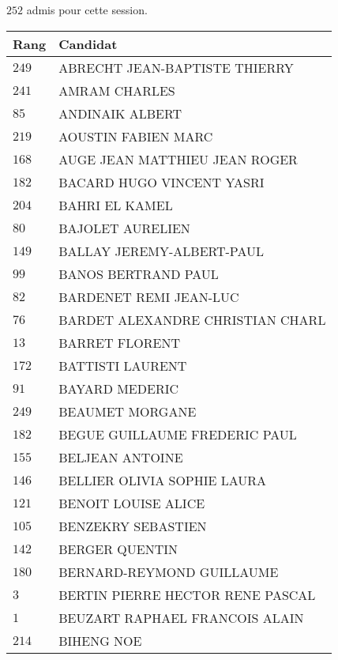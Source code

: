 



  $252$ admis pour cette session.

  \begin{xltabular}{\linewidth}{|l|X|}
    \hline
    \textbf{Rang} & \textbf{Candidat} \\
    \hline
    $249$ & ABRECHT JEAN-BAPTISTE THIERRY \\
    \hline
    $241$ & AMRAM CHARLES \\
    \hline
    $85$ & ANDINAIK ALBERT \\
    \hline
    $219$ & AOUSTIN FABIEN MARC \\
    \hline
    $168$ & AUGE JEAN MATTHIEU JEAN ROGER \\
    \hline
    $182$ & BACARD HUGO VINCENT YASRI \\
    \hline
    $204$ & BAHRI EL KAMEL \\
    \hline
    $80$ & BAJOLET AURELIEN \\
    \hline
    $149$ & BALLAY JEREMY-ALBERT-PAUL \\
    \hline
    $99$ & BANOS BERTRAND PAUL \\
    \hline
    $82$ & BARDENET REMI JEAN-LUC \\
    \hline
    $76$ & BARDET ALEXANDRE CHRISTIAN CHARL \\
    \hline
    $13$ & BARRET FLORENT \\
    \hline
    $172$ & BATTISTI LAURENT \\
    \hline
    $91$ & BAYARD MEDERIC \\
    \hline
    $249$ & BEAUMET MORGANE \\
    \hline
    $182$ & BEGUE GUILLAUME FREDERIC PAUL \\
    \hline
    $155$ & BELJEAN ANTOINE \\
    \hline
    $146$ & BELLIER OLIVIA SOPHIE LAURA \\
    \hline
    $121$ & BENOIT LOUISE ALICE \\
    \hline
    $105$ & BENZEKRY SEBASTIEN \\
    \hline
    $142$ & BERGER QUENTIN \\
    \hline
    $180$ & BERNARD-REYMOND GUILLAUME \\
    \hline
    $3$ & BERTIN PIERRE HECTOR RENE PASCAL \\
    \hline
    $1$ & BEUZART RAPHAEL FRANCOIS ALAIN \\
    \hline
    $214$ & BIHENG NOE \\

\end{xltabular}
